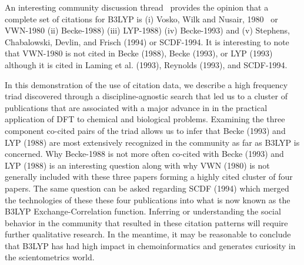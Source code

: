 \documentclass[11pt, oneside]{article}   	%
\begin{document}
An interesting community discussion thread~\citep{johansson2002} provides the opinion that a complete set of citations for B3LYP is (i) Vosko, Wilk and Nusair, 1980~\citep{vosko1980accurate} or VWN-1980 (ii) Becke-1988) (iii) LYP-1988) (iv) Becke-1993) and (v) Stephens, Chabalowski, Devlin, and Frisch (1994) or SCDF-1994. It is interesting to note that VWN-1980  is not cited in Becke (1988), Becke (1993), or LYP (1993) although it is cited in Laming et al. (1993), Reynolds (1993), and SCDF-1994.

In this demonstration of the use of citation data, we describe a high frequency triad discovered through a discipline-agnostic search that led us to a cluster of publications that are associated with a major advance in  in the practical application of DFT to chemical and biological problems. Examining the three component co-cited pairs of the triad allows us to infer that Becke (1993) and LYP (1988) are most extensively recognized in the community as far as B3LYP is concerned. Why Becke-1988 is not more often co-cited with Becke (1993) and LYP (1988) is an interesting question along with why VWN (1980) is not generally included with these three papers forming a highly cited cluster of four papers. The same question can be asked regarding SCDF (1994) which merged the technologies of these these four publications into what is now known as the B3LYP Exchange-Correlation function.  Inferring or understanding the social behavior in the community that resulted in these citation patterns will require further qualitative research. In the meantime, it may be reasonable to conclude that B3LYP has had high impact in chemoinformatics and generates curiosity in the scientometrics world.



\end{document}
